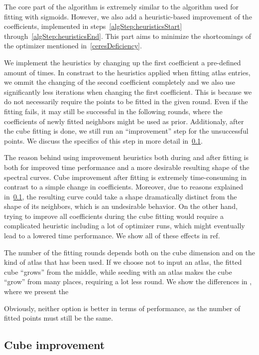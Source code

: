 The core part of the algorithm is extremely similar to the algorithm used for fitting with sigmoids. However, we also add a heuristic-based improvement of the coefficients, implemented in steps~\ref{algStep:heuristicsStart} through~\ref{algStep:heuristicsEnd}. This part aims to minimize the shortcomings of the optimizer mentioned in~\cref{ceresDeficiency}.

We implement the heuristics by changing up the first coefficient a pre-defined amount of times. In constrast to the heuristics applied when fitting atlas entries, we ommit the changing of the second coefficient completely and we also use significantly less iterations when changing the first coefficient. This is because we do not necessarily require the points to be fitted in the given round. Even if the fitting fails, it may still be successful in the following rounds, where the coefficients of newly fitted neighbors might be used as prior. Additionaly, after the cube fitting is done, we still run an ``improvement'' step for the unsuccessful points. We discuss the specifics of this step in more detail in~\cref{ssec:cubeImprovement}.

The reason behind using improvement heuristics both during and after fitting is both for improved time performance and a more desirable resulting shape of the spectral curves. Cube improvement after fitting is extremely time-consuming in contrast to a simple change in coefficients. Moreover, due to reasons explained in~\cref{ssec:cubeImprovement}, the resulting curve could take a shape dramatically distinct from the shape of its neighbors, which is an undesirable behavior. On the other hand, trying to improve all coefficients during the cube fitting would require a complicated heuristic including a lot of optimizer runs, which might eventually lead to a lowered time performance. We show all of these effects in ref.

The number of the fitting rounds depends both on the cube dimension and on the kind of atlas that has been used. If we choose not to input an atlas, the fitted cube ``grows'' from the middle, while seeding with an atlas makes the cube ``grow'' from many places, requiring a lot less round. We show the differences in , where we present the 

Obviously, neither option is better in terms of performance, as the number of fitted points must still be the same. 

\subsection{Cube improvement} \label{ssec:cubeImprovement}

